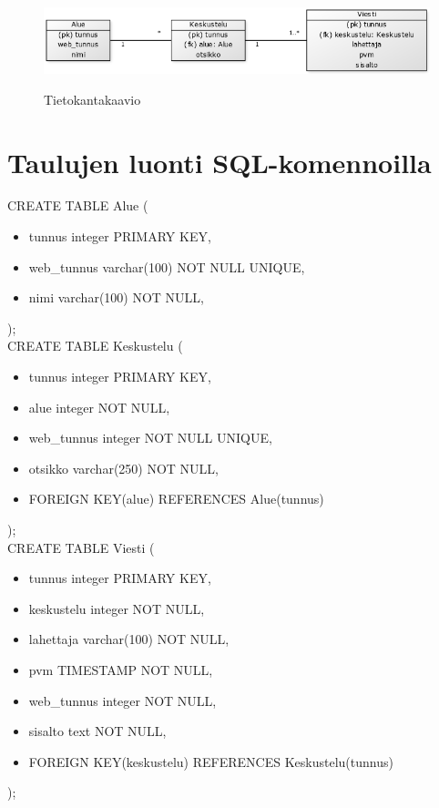 \documentclass[titlepage]{article}
\begin{document}
\begin{figure}[H]
\includegraphics[width=\textwidth]{tietokantakaavio}
\label{tkkaavio}
\caption{Tietokantakaavio}
\end{figure}

\section*{Taulujen luonti SQL-komennoilla}

CREATE TABLE Alue ( 
\begin{itemize}
	\item[] tunnus integer PRIMARY KEY,
    \item[] web{\_}tunnus varchar(100) NOT NULL UNIQUE,
    \item[] nimi varchar(100) NOT NULL,
\end{itemize}
); \\

CREATE TABLE Keskustelu ( 
\begin{itemize}
	\item[] tunnus integer PRIMARY KEY,
    \item[] alue integer NOT NULL,
    \item[] web{\_}tunnus integer NOT NULL UNIQUE,
    \item[] otsikko varchar(250) NOT NULL,
    \item[] FOREIGN KEY(alue) REFERENCES Alue(tunnus)

\end{itemize}
); \\

CREATE TABLE Viesti ( 
\begin{itemize}
	\item[] tunnus integer PRIMARY KEY,
    \item[] keskustelu integer NOT NULL,
    \item[] lahettaja varchar(100) NOT NULL,
    \item[] pvm TIMESTAMP NOT NULL,
    \item[] web{\_}tunnus integer NOT NULL,
    \item[] sisalto text NOT NULL,
    \item[] FOREIGN KEY(keskustelu) REFERENCES Keskustelu(tunnus)


\end{itemize}
); \\
\end{document}
